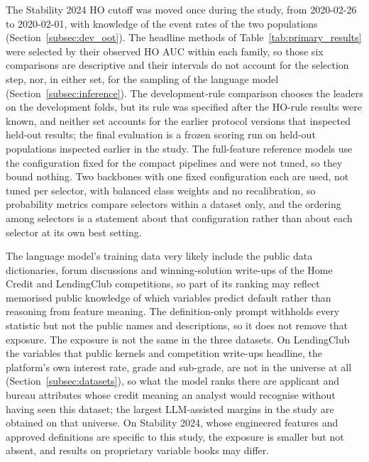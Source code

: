 \documentclass[final,5p,twocolumn]{elsarticle}
\providecommand{\DIFaddbegin}{} %
\begin{document}
The Stability 2024 HO cutoff was moved once during the study, from 2020-02-26 to 2020-02-01, with knowledge of the event rates of the two populations (Section~\ref{subsec:dev_oot}). The headline methods of Table~\ref{tab:primary_results} were selected by their observed HO AUC within each family, so those six comparisons are descriptive and their intervals do not account for the selection step, nor, in either set, for the sampling of the language model (Section~\ref{subsec:inference}). The development-rule comparison chooses the leaders on the development folds, but its rule was specified after the HO-rule results were known, and neither set accounts for the earlier protocol versions that inspected held-out results; the final evaluation is a frozen scoring run on held-out populations inspected earlier in the study. The full-feature reference models use the configuration fixed for the compact pipelines and were not tuned, so they bound nothing. Two backbones with one fixed configuration each are used, not tuned per selector, with balanced class weights and no recalibration, so probability metrics compare selectors within a dataset only, and the ordering among selectors is a statement about that configuration rather than about each selector at its own best setting.

The language model's training data very likely include the public data dictionaries, forum discussions and winning-solution write-ups of the Home Credit and LendingClub competitions, so part of its ranking may reflect memorised public knowledge of which variables predict default rather than reasoning from feature meaning. The definition-only prompt withholds every statistic but not the public names and descriptions, so it does not remove that exposure. The exposure is not the same in the three datasets. On LendingClub the variables that public kernels and competition write-ups headline, the platform's own interest rate, grade and sub-grade, are not in the universe at all (Section~\ref{subsec:datasets}), so what the model ranks there are applicant and bureau attributes whose credit meaning an analyst would recognise without having seen this dataset; the largest LLM-assisted margins in the study are obtained on that universe. On Stability 2024, whose engineered features and approved definitions are specific to this study, the exposure is smaller but not absent, and results on proprietary variable books may differ.
\DIFaddbegin 
\end{document}
